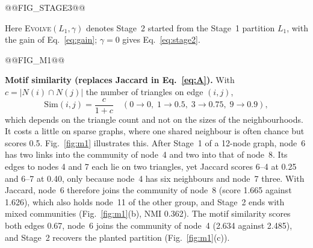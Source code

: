 \documentclass[conference]{IEEEtran}
\begin{document}
@@FIG_STAGE3@@

\noindent Here \textsc{Evolve}$(L_1,\gamma)$ denotes Stage~2 started from the Stage~1 partition $L_1$, with the gain of Eq.~\eqref{eq:gain}; $\gamma=0$ gives Eq.~\eqref{eq:stage2}.










@@FIG_M1@@

\textbf{Motif similarity (replaces Jaccard in Eq.~\eqref{eq:A}).} With $c=|N(i)\cap N(j)|$ the number of triangles on edge $(i,j)$,
\begin{equation}
\mathrm{Sim}(i,j)=\frac{c}{1+c}\quad(0\to0,\;1\to0.5,\;3\to0.75,\;9\to0.9),\label{eq:motif}
\end{equation}
which depends on the triangle count and not on the sizes of the neighbourhoods. It costs a little on sparse graphs, where one shared neighbour is often chance but scores 0.5. Fig.~\ref{fig:m1} illustrates this. After Stage~1 of a 12-node graph, node~6 has two links into the community of node~4 and two into that of node~8. Its edges to nodes 4 and 7 each lie on two triangles, yet Jaccard scores 6--4 at 0.25 and 6--7 at 0.40, only because node~4 has six neighbours and node~7 three. With Jaccard, node~6 therefore joins the community of node~8 (score 1.665 against 1.626), which also holds node~11 of the other group, and Stage~2 ends with mixed communities (Fig.~\ref{fig:m1}(b), NMI 0.362). The motif similarity scores both edges 0.67, node~6 joins the community of node~4 (2.634 against 2.485), and Stage~2 recovers the planted partition (Fig.~\ref{fig:m1}(c)).
\end{document}
